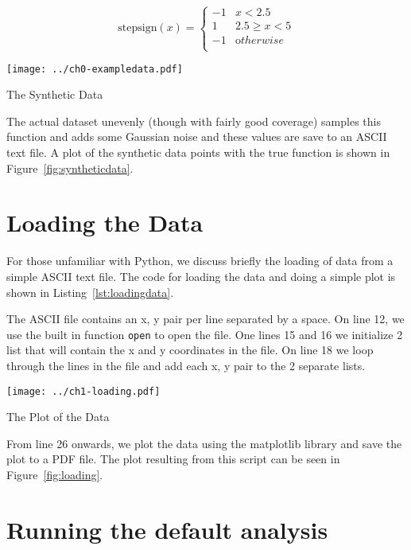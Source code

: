 \documentclass{tufte-handout}
\begin{document}
\begin{equation}
\mathrm{stepsign}(x) = \left\{ \begin{array}{rl}
-1 & x < 2.5 \\
1 & 2.5 \ge x < 5 \\
-1 & {\mathrm otherwise} \\
\end{array}
\right.
\end{equation}

\begin{marginfigure}
\texttt{[image: ../ch0-exampledata.pdf]}
\caption{The Synthetic Data}
\label{fig:syntheticdata}
\end{marginfigure}

The actual dataset unevenly (though with fairly good coverage) samples
this function and adds some Gaussian noise and these values are save
to an ASCII text file. A plot of the synthetic data points with the 
true function is shown in Figure~\ref{fig:syntheticdata}.

\section{Loading the Data}

For those unfamiliar with Python, we discuss briefly the loading of data
from a simple ASCII text file. The code for loading the data and doing
a simple plot is shown in Listing~\ref{lst:loadingdata}.

\lstset{caption=Loading the Data,label=lst:loadingdata}


The ASCII file contains an x, y pair per line separated by a space. On
line 12, we use the built in function {\tt open} to open the file. One
lines 15 and 16 we initialize 2 list that will contain the x and y 
coordinates in the file. On line 18 we loop through the lines in the 
file and add each x, y pair to the 2 separate lists.

\begin{marginfigure}
\texttt{[image: ../ch1-loading.pdf]}
\caption{The Plot of the Data}
\label{fig:loading}
\end{marginfigure}

From line 26 onwards, we plot the data using the matplotlib library
and save the plot to a PDF file. The plot resulting from this script
can be seen in Figure~\ref{fig:loading}.

\section{Running the default analysis}
\end{document}
